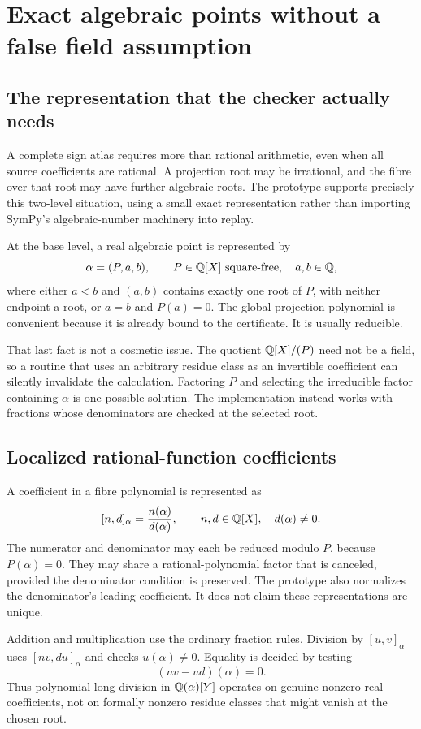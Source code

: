 \section{Exact algebraic points without a false field assumption}
\label{sec:arithmetic}
\subsection{The representation that the checker actually needs}
A complete sign atlas requires more than rational arithmetic, even when all source coefficients are rational. A projection root may be irrational, and the fibre over that root may have further algebraic roots. The prototype supports precisely this two-level situation, using a small exact representation rather than importing SymPy's algebraic-number machinery into replay.

At the base level, a real algebraic point is represented by
\[
 \alpha=(P,a,b),\qquad P\in\mathbb Q[X]\text{ square-free},\quad a,b\in\mathbb Q,
\]
where either $a<b$ and $(a,b)$ contains exactly one root of $P$, with neither endpoint a root, or $a=b$ and $P(a)=0$. The global projection polynomial is convenient because it is already bound to the certificate. It is usually reducible.

That last fact is not a cosmetic issue. The quotient $\mathbb Q[X]/(P)$ need not be a field, so a routine that uses an arbitrary residue class as an invertible coefficient can silently invalidate the calculation. Factoring $P$ and selecting the irreducible factor containing $\alpha$ is one possible solution. The implementation instead works with fractions whose denominators are checked at the selected root.

\subsection{Localized rational-function coefficients}
A coefficient in a fibre polynomial is represented as
\begin{equation}\label{eq:local-coeff}
 [n,d]_\alpha=\frac{n(\alpha)}{d(\alpha)},\qquad n,d\in\mathbb Q[X],\quad d(\alpha)\ne0.
\end{equation}
The numerator and denominator may each be reduced modulo $P$, because $P(\alpha)=0$. They may share a rational-polynomial factor that is canceled, provided the denominator condition is preserved. The prototype also normalizes the denominator's leading coefficient. It does not claim these representations are unique.

Addition and multiplication use the ordinary fraction rules. Division by $[u,v]_\alpha$ uses $[nv,du]_\alpha$ and checks $u(\alpha)\ne0$. Equality is decided by testing
\[
 (nv-ud)(\alpha)=0.
\]
Thus polynomial long division in $\mathbb Q(\alpha)[Y]$ operates on genuine nonzero real coefficients, not on formally nonzero residue classes that might vanish at the chosen root.

